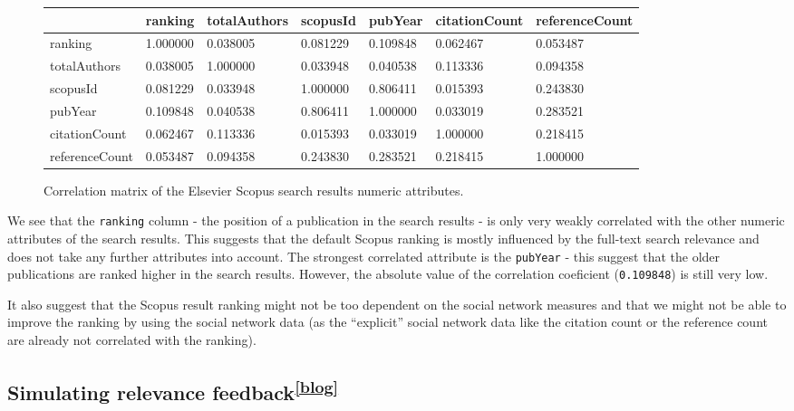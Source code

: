 \begin{figure}[ht!]
        \scriptsize
        \centering
        \begin{tabular}{|l|l|l|l|l|l|l|}
        \hline
            ~ & ranking & totalAuthors & scopusId & pubYear & citationCount & referenceCount \\ \hline
            ranking & 1.000000 & 0.038005 & 0.081229 & 0.109848 & 0.062467 & 0.053487 \\ \hline
            totalAuthors & 0.038005 & 1.000000 & 0.033948 & 0.040538 & 0.113336 & 0.094358 \\ \hline
            scopusId & 0.081229 & 0.033948 & 1.000000 & 0.806411 & 0.015393 & 0.243830 \\ \hline
            pubYear & 0.109848 & 0.040538 & 0.806411 & 1.000000 & 0.033019 & 0.283521 \\ \hline
            citationCount & 0.062467 & 0.113336 & 0.015393 & 0.033019 & 1.000000 & 0.218415 \\ \hline
            referenceCount & 0.053487 & 0.094358 & 0.243830 & 0.283521 & 0.218415 & 1.000000 \\ \hline
        \end{tabular}
    \caption{Correlation matrix of the Elsevier Scopus search results numeric attributes.} 
\end{figure}

We see that the \texttt{ranking} column - the position of a publication in the search results - is only very weakly correlated with the other numeric attributes of the search results.
This suggests that the default Scopus ranking is mostly influenced by the full-text search relevance and does not take any further attributes into account.
The strongest correlated attribute is the \texttt{pubYear} - this suggest that the older publications are ranked higher in the search results.
However, the absolute value of the correlation coeficient (\texttt{0.109848}) is still very low.

It also suggest that the Scopus result ranking might not be too dependent on the social network measures and that we might not be able to improve the ranking 
by using the social network data (as the ``explicit'' social network data like the citation count or the reference count are already not correlated with the ranking).

\subsection[Simulating relevance feedback]{Simulating relevance feedback\textsuperscript{\href{https://jindrich.bar/edu/thesis-blog/ndcg-benchmark/}{[blog]}}}

